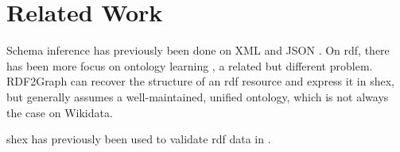 \documentclass{scrartcl}
\begin{document}
\section{Related Work}

Schema inference has previously been done on XML \cite{Bex:2007:IXS:1325851.1325964} and JSON \cite{json-inference}.
On \gls{rdf}, there has been more focus on ontology learning \cite{Zhou2007}, a related but different problem.
RDF2Graph \cite{vanDam2015} can recover the structure of an \gls{rdf} resource and express it in \gls{shex},
but generally assumes a well-maintained, unified ontology,
which is not always the case on Wikidata.


\gls{shex} has previously been used to validate \gls{rdf} data in \cite{SOLBRIG201790}.



\end{document}
